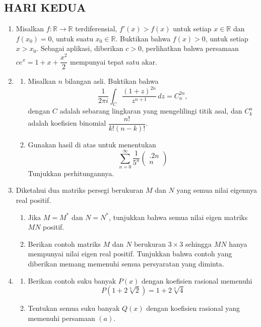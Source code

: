 \documentclass[12pt,twoside]{article}
\begin{document}
\subsection{HARI KEDUA}
\begin{enumerate}
    \item Misalkan $f:\mathbb{R}\to\mathbb{R}$ terdiferensial, $f'(x)>f(x) $ untuk setiap $x\in\mathbb{R}$ dan $f(x_0)=0$, untuk suatu $x_0\in\mathbb{R}$. Buktikan bahwa $f(x)>0$, untuk setiap $x>x_0$. Sebagai aplikasi, diberikan $c>0$, perlihatkan bahwa persamaan $ce^x=1+x+\dfrac{x^2}{2}$ mempunyai tepat satu akar.

    \item \begin{enumerate}
              \item [(a)] Misalkan $n$ bilangan asli. Buktikan bahwa
                    $$\dfrac{1}{2\pi i}\int_{C}\dfrac{(1+z)^{2n}}{z^{n+1}}\,dz=C_{n}^{2n},$$
                    dengan $C$ adalah sebarang lingkaran yang mengelilingi titik asal, dan $C_k^n$ adalah koefisien binomial $\dfrac{n!}{k!(n-k)!}$.

              \item[(b)] Gunakan hasil di atas untuk menentukan
                    $$\sum_{n=0}^{\infty}\dfrac{1}{5^n}\begin{pmatrix}.
                            2n \\n
                        \end{pmatrix}$$
                    Tunjukkan perhitungannya.
          \end{enumerate}

    \item Diketahui dua matriks persegi berukuran $M$ dan $N$ yang semua nilai eigennya real positif.
          \begin{enumerate}
              \item[(a)] Jika $M=M^*$ dan $N=N^*$, tunjukkan bahwa semua nilai eigen matriks $MN$ positif.
              \item[(b)] Berikan contoh matriks $M$ dan $N$ berukuran $3\times3$ sehingga $MN$ hanya mempunyai nilai eigen real positif. Tunjukkan bahwa contoh yang diberikan memang  memenuhi semua persyaratan yang diminta.

          \end{enumerate}

    \item \begin{enumerate}
              \item [(a)] Berikan contoh suku banyak $P(x)$ dengan koefisien rasional memenuhi
                    $$P(1+2\sqrt[3]{2})=1+2\sqrt[3]{4}$$
              \item[(b)] Tentukan semua suku banyak $Q(x)$ dengan koefisien rasional yang memenuhi persamaan $(a)$.


\end{enumerate}
\end{enumerate}
\end{document}
